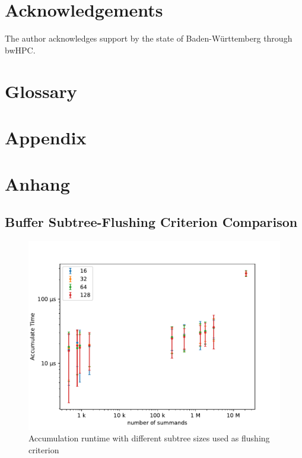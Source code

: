 
\chapter{Acknowledgements}
The author acknowledges support by the state of Baden-Württemberg through bwHPC.

\chapter{Glossary}
\printglossary[type=\acronymtype]
\printglossary

{\chapter{Appendix}}    %
{\chapter{Anhang}}      %
\label{chap:appendix}

\section{Buffer Subtree-Flushing Criterion Comparison}

\begin{figure}[H]
\centering
\includegraphics[scale=0.8]{figures/bufferSizes.pdf}
\caption{Accumulation runtime with different subtree sizes used as flushing criterion}
\label{fig:bufferFlushingCriterion}
\end{figure}

